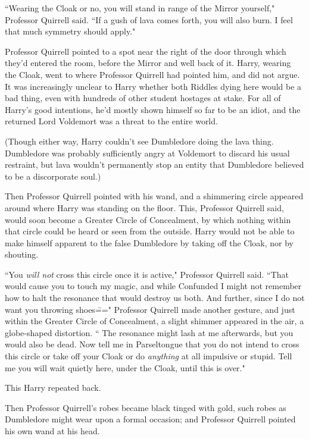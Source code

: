``Wearing the Cloak or no, you will stand in range of the Mirror yourself," Professor Quirrell said. ``If a gush of lava comes forth, you will also burn. I feel that much symmetry should apply."

Professor Quirrell pointed to a spot near the right of the door through which they'd entered the room, before the Mirror and well back of it. Harry, wearing the Cloak, went to where Professor Quirrell had pointed him, and did not argue. It was increasingly unclear to Harry whether both Riddles dying here would be a bad thing, even with hundreds of other student hostages at stake. For all of Harry's good intentions, he'd mostly shown himself so far to be an idiot, and the returned Lord Voldemort was a threat to the entire world.

(Though either way, Harry couldn't see Dumbledore doing the lava thing. Dumbledore was probably sufficiently angry at Voldemort to discard his usual restraint, but lava wouldn't permanently stop an entity that Dumbledore believed to be a discorporate soul.)

Then Professor Quirrell pointed with his wand, and a shimmering circle appeared around where Harry was standing on the floor. This, Professor Quirrell said, would soon become a Greater Circle of Concealment, by which nothing within that circle could be heard or seen from the outside. Harry would not be able to make himself apparent to the false Dumbledore by taking off the Cloak, nor by shouting.

``You \emph{will not} cross this circle once it is active," Professor Quirrell said. ``That would cause you to touch my magic, and while Confunded I might not remember how to halt the resonance that would destroy us both. And further, since I do not want you throwing shoes\===" Professor Quirrell made another gesture, and just within the Greater Circle of Concealment, a slight shimmer appeared in the air, a globe-shaped distortion. `` The resonance might lash at me afterwards, but you would also be dead. Now tell me in Parseltongue that you do not intend to cross this circle or take off your Cloak or do \emph{anything} at all impulsive or stupid. Tell me you will wait quietly here, under the Cloak, until this is over."

This Harry repeated back.

Then Professor Quirrell's robes became black tinged with gold, such robes as Dumbledore might wear upon a formal occasion; and Professor Quirrell pointed his own wand at his head.


